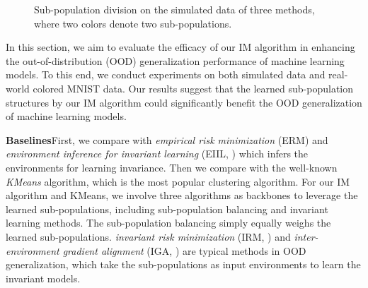 \begin{figure}
\centering
\begin{minipage}{1.0\textwidth}
  \centering
{}      
	\vskip -0.1in
  \caption{Sub-population division on the simulated data of three methods, where two colors denote two sub-populations.}
  \label{fig:test3}
\end{minipage}
\end{figure}


 In this section, we aim to evaluate the efficacy of our IM algorithm in enhancing the out-of-distribution (OOD) generalization performance of machine learning models. 
 To this end, we conduct experiments on both simulated data and real-world colored MNIST data. 
 Our results suggest that the learned sub-population structures by our IM algorithm could significantly benefit the OOD generalization of machine learning models.

\textbf{Baselines}\quad First, we compare with \emph{empirical risk minimization} (ERM) and \emph{environment inference for invariant learning} (EIIL, \citep{creager2021environment}) which infers the environments for learning invariance.
Then we compare with the well-known \emph{KMeans} algorithm, which is the most popular clustering algorithm.
For our IM algorithm and KMeans, we involve three algorithms as backbones to leverage the learned sub-populations, including sub-population balancing and invariant learning methods.
The sub-population balancing simply equally weighs the learned sub-populations.
\emph{invariant risk minimization} (IRM, \citep{arjovsky2019invariant}) and \emph{inter-environment gradient alignment} (IGA, \citep{koyama2020out}) are typical methods in OOD generalization, which take the sub-populations as input environments to learn the invariant models.

